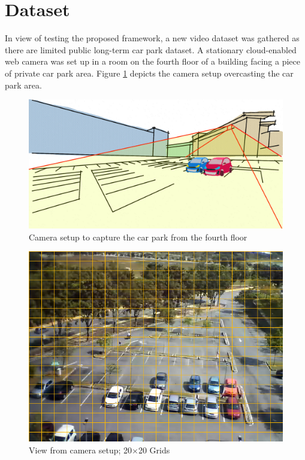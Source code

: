 \section{Dataset}
\label{section:dataset_used}

In view of testing the proposed framework, a new video dataset was gathered as there are limited public long-term car park dataset. A stationary cloud-enabled web camera was set up in a room on the fourth floor of a building facing a piece of private car park area. Figure \ref{fig:camerasetup} depicts the camera setup overcasting the car park area.



\begin{figure}[hbt!]\centering
\includegraphics[width=.8\textwidth]{image/new/fcicarpark2.png}
\caption{Camera setup to capture the car park from the fourth floor}
\label{fig:camerasetup}
\end{figure}


\begin{figure}[!hbt]\centering
\includegraphics[width=.7\textwidth]{image/general/grids.png}
\caption{View from camera setup; 20$\times$20 Grids}
\label{fig:viewfromcamera}
\end{figure}



